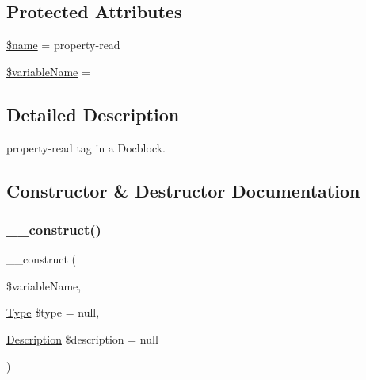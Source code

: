 \subsection*{Protected Attributes}
\begin{DoxyCompactItemize}
\item 
\mbox{\hyperlink{classphp_documentor_1_1_reflection_1_1_doc_block_1_1_tags_1_1_property_read_ab2fc40d43824ea3e1ce5d86dee0d763b}{\$name}} = \textquotesingle{}property-\/read\textquotesingle{}
\item 
\mbox{\hyperlink{classphp_documentor_1_1_reflection_1_1_doc_block_1_1_tags_1_1_property_read_a34a81eb3c92d37d458c6d18032faee7e}{\$variable\+Name}} = \textquotesingle{}\textquotesingle{}
\end{DoxyCompactItemize}


\subsection{Detailed Description}
property-\/read tag in a Docblock. 

\subsection{Constructor \& Destructor Documentation}
\mbox{\label{classphp_documentor_1_1_reflection_1_1_doc_block_1_1_tags_1_1_property_read_a1e5de5b31a43e9ffe064e27942aa5e63}} 
\subsubsection{\texorpdfstring{\+\_\+\+\_\+construct()}{\_\_construct()}}
{\footnotesize\ttfamily \+\_\+\+\_\+construct (\begin{DoxyParamCaption}\item[{}]{\$variable\+Name,  }\item[{\mbox{\hyperlink{interfacephp_documentor_1_1_reflection_1_1_type}{Type}}}]{\$type = {\ttfamily null},  }\item[{\mbox{\hyperlink{classphp_documentor_1_1_reflection_1_1_doc_block_1_1_description}{Description}}}]{\$description = {\ttfamily null} }\end{DoxyParamCaption})}


